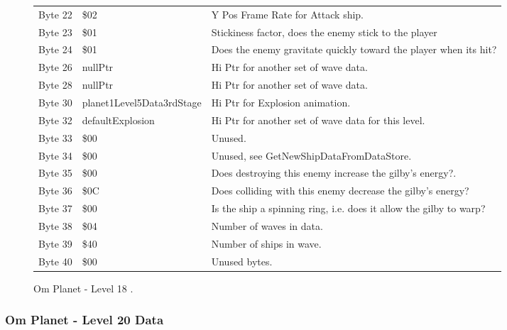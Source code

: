 \begin{figure}[H]
{\begin{adjustbox}{width=12cm}
\begin{tabular}{lll}
 Byte 22 & \$02                       & Y Pos Frame Rate for Attack ship.                                  \\
 Byte 23 & \$01                       & Stickiness factor, does the enemy stick to the player              \\
 Byte 24 & \$01                       & Does the enemy gravitate quickly toward the player when its hit?   \\
 Byte 26 & nullPtr                   & Hi Ptr for another set of wave data.                               \\
 Byte 28 & nullPtr                   & Hi Ptr for another set of wave data.                               \\
 Byte 30 & planet1Level5Data3rdStage & Hi Ptr for Explosion animation.                                    \\
 Byte 32 & defaultExplosion          & Hi Ptr for another set of wave data for this level.                \\
 Byte 33 & \$00                       & Unused.                                                            \\
 Byte 34 & \$00                       & Unused, see GetNewShipDataFromDataStore.                           \\
 Byte 35 & \$00                       & Does destroying this enemy increase the gilby's energy?.           \\
 Byte 36 & \$0C                       & Does colliding with this enemy decrease the gilby's energy?        \\
 Byte 37 & \$00                       & Is the ship a spinning ring, i.e. does it allow the gilby to warp? \\
 Byte 38 & \$04                       & Number of waves in data.                                           \\
 Byte 39 & \$40                       & Number of ships in wave.                                           \\
 Byte 40 & \$00                       & Unused bytes.                                                      \\
\bottomrule
\end{tabular}

  \end{adjustbox}

  }\caption*{Om Planet - Level 18
.}
\end{figure}

\clearpage
\subsubsection{Om Planet - Level 20 Data}

